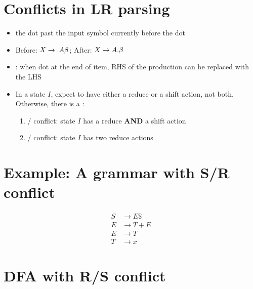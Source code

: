 \documentclass[10pt,a4paper,landscape]{article}
\begin{document}
\pagestyle{empty}
\begin{multicols*}{3}
% 
\section*{Conflicts in LR parsing}
\begin{itemize}
\item {} the dot past the input symbol currently before the dot
\item[] Before: $X\to \lrd A\beta$; After: $X\to A\lrd\beta$
\item {}: when dot at the end of item, RHS of the production can be replaced with the LHS
\item In a state $I$, expect to have either a reduce or a shift action, not both. Otherwise, there is a :
  \begin{enumerate}
  \item {}/ conflict: state $I$ has a reduce \textbf{AND} a shift action
  \item {}/ conflict: state $I$ has two reduce actions
  \end{enumerate}
\end{itemize}
\section*{Example: A grammar with S/R conflict}
\begin{align*}
  S&\to E\$   \tag{0} \\
  E&\to T + E \tag{1} \\
  E&\to T     \tag{2} \\
  T&\to x     \tag{3}
\end{align*}
\section*{DFA with R/S conflict}
\end{multicols*}
\end{document}
